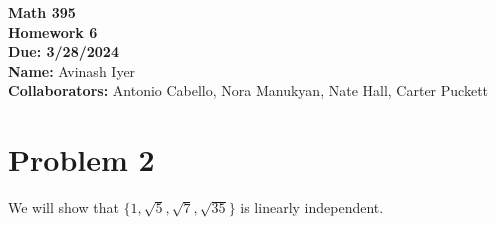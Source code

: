 \documentclass[11pt]{extarticle}
\title{}
\author{}
\date{}
\begin{document}
  \begin{center}
    {\bf \Large Math 395 \\[0.1in]Homework 6 \\[0.1in]
    Due: 3/28/2024}\\[.25in]
    {\bf Name:} {Avinash Iyer}\\[0.15in]
    {\bf Collaborators:} {Antonio Cabello, Nora Manukyan, Nate Hall, Carter Puckett} \\
  \end{center}
  \section{Problem 2}%
  We will show that $\{1,\sqrt{5},\sqrt{7},\sqrt{35}\}$ is linearly independent.\\
\end{document}
